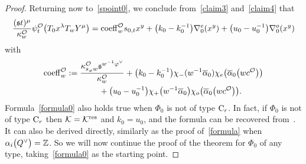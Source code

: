 \documentclass[pdftex]{sigma}
\numberwithin{equation}{section}
\begin{document}
\begin{proof}
Returning now to~\eqref{spoint0},
we conclude from~\eqref{claim3} and~\eqref{claim4} that
\begin{equation}\label{formula0}
\frac{(\mathfrak{s}t)^\mu}{\kappa_w^\mathcal{O}}\psi_{t}^\mathcal{O}\bigl(T_0x^\lambda T_wY^\mu\bigr)
={\rm coeff}_w^\mathcal{O}s_{0,t}x^y+\bigl(k_0-k_0^{-1}\bigr)\nabla_0^e(x^y)+\bigl(u_0-u_0^{-1}\bigr)\nabla_0^o(x^y)
\end{equation}
with
\begin{gather}
{\rm coeff}_w^\mathcal{O}:=\frac{\kappa_{s_\varphi w}^\mathcal{O}\mathfrak{s}^{w^{-1}\varphi^\vee}}{\kappa_w^\mathcal{O}}+\bigl(k_0-k_0^{-1}\bigr)\chi_-(w^{-1}\overline{\alpha}_0)\chi_e \bigl(\overline{\alpha}_0\bigl(wc^\mathcal{O}\bigr)\bigr)\nonumber\\
\hphantom{{\rm coeff}_w^\mathcal{O}:=}{}
+\bigl(u_0-u_0^{-1}\bigr)\chi_+\bigl(w^{-1}\overline{\alpha}_0\bigr)\chi_o\bigl(\overline{\alpha}_0\bigl(wc^\mathcal{O}\bigr)\bigr).
\label{coeff}
\end{gather}
Formula~\eqref{formula0} also holds true when $\Phi_0$ is not of type ${\rm C}_r$. In fact, if $\Phi_0$ is not of type ${\rm C}_r$ then $\mathcal{K}=\mathcal{K}^{{\rm res}}$ and $k_0=u_0$,
and the formula can be recovered from~\cite[Section~5]{SSV2}. It can also be derived directly, similarly as the proof of~\eqref{formula} when $\alpha_i\smash{\bigl(Q^\vee\bigr)}=\mathbb{Z}$.
So we will now continue the proof of the theorem for $\Phi_0$ of any type, taking~\eqref{formula0} as the starting point.


\end{proof}
\end{document}
